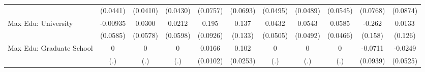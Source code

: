 {\begin{tabular}{l*{10}{c}}
            &    (0.0441)         &    (0.0410)         &    (0.0430)         &    (0.0757)         &    (0.0693)         &    (0.0495)         &    (0.0489)         &    (0.0545)         &    (0.0768)         &    (0.0874)         \\
\addlinespace
Max Edu: University&    -0.00935         &      0.0300         &      0.0212         &       0.195\sym{*}  &       0.137         &      0.0432         &      0.0543         &      0.0585         &      -0.262         &      0.0133         \\
            &    (0.0585)         &    (0.0578)         &    (0.0598)         &    (0.0926)         &     (0.133)         &    (0.0505)         &    (0.0492)         &    (0.0466)         &     (0.158)         &     (0.126)         \\
\addlinespace
Max Edu: Graduate School&           0         &           0         &           0         &      0.0166         &       0.102\sym{***}&           0         &           0         &           0         &     -0.0711         &     -0.0249         \\
            &         (.)         &         (.)         &         (.)         &    (0.0102)         &    (0.0253)         &         (.)         &         (.)         &         (.)         &    (0.0939)         &    (0.0525)         \\
\bottomrule
\end{tabular}
}
